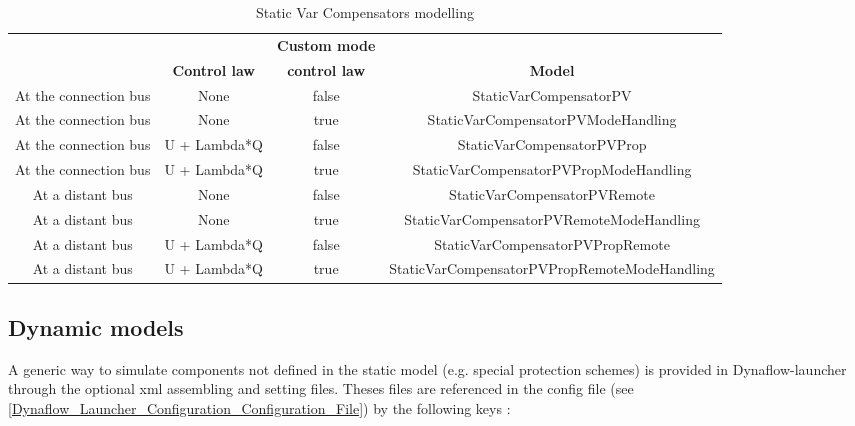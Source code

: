 \documentclass[a4paper, 12pt]{report}
\begin{document}
\begin{table}[h!]
\center
\begin{tabular}{ c | c | c | c}
\toprule
& & \scriptsize{\textbf{{Custom mode}}} &  \\
\scriptsize{\multirow{-2}{*}{\textbf{{Voltage regulation}}}}& \multirow{-2}{*}{\scriptsize{\textbf{{Control law}}}}& \scriptsize{\textbf{{control law}}} & \multirow{-2}{*}{\scriptsize{\textbf{{Model}}}} \\
\midrule
\rowcolor{white}
 \scriptsize{At the connection bus} & \scriptsize{None}& \scriptsize{false}& \scriptsize{StaticVarCompensatorPV} \\
\rowcolor{gray!10}
 \scriptsize{At the connection bus} & \scriptsize{None}& \scriptsize{true}& \scriptsize{StaticVarCompensatorPVModeHandling} \\
\rowcolor{white}
 \scriptsize{At the connection bus} & \scriptsize{U + Lambda*Q}& \scriptsize{false}& \scriptsize{StaticVarCompensatorPVProp} \\
\rowcolor{gray!10}
 \scriptsize{At the connection bus} & \scriptsize{U + Lambda*Q}& \scriptsize{true}& \scriptsize{StaticVarCompensatorPVPropModeHandling} \\
\rowcolor{white}
 \scriptsize{At a distant bus} & \scriptsize{None}& \scriptsize{false}& \scriptsize{StaticVarCompensatorPVRemote} \\
\rowcolor{gray!10}
 \scriptsize{At a distant bus} & \scriptsize{None}& \scriptsize{true}& \scriptsize{StaticVarCompensatorPVRemoteModeHandling} \\
\rowcolor{white}
 \scriptsize{At a distant bus} & \scriptsize{U + Lambda*Q}& \scriptsize{false}& \scriptsize{StaticVarCompensatorPVPropRemote} \\
\rowcolor{gray!10}
 \scriptsize{At a distant bus} & \scriptsize{U + Lambda*Q}& \scriptsize{true}& \scriptsize{StaticVarCompensatorPVPropRemoteModeHandling} \\
\bottomrule
\end{tabular}
\caption{Static Var Compensators modelling}
\end{table}

\subsection{Dynamic models}
\label{DFL_Dyn_Models}

A generic way to simulate components not defined in the static model (e.g. special protection schemes) is provided in Dynaflow-launcher through the optional xml assembling and setting files. Theses files are referenced in the config file (see \ref{Dynaflow_Launcher_Configuration_Configuration_File}) by the following keys :
\end{document}
